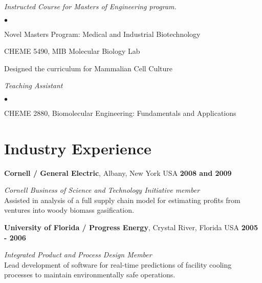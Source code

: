 \documentclass[margin,line]{res}
\newenvironment{list2}{
  \begin{list}{$\bullet$}{%
      \setlength{\itemsep}{0in}
      \setlength{\parsep}{0in} \setlength{\parskip}{0in}
      \setlength{\topsep}{0in} \setlength{\partopsep}{0in} 
      \setlength{\leftmargin}{0.2in}}}{\end{list}}
\begin{document}
\begin{resume}

{\em Instructed Course for Masters of Engineering program.}
\begin{list2}
\item Novel Masters Program: Medical and Industrial Biotechnology
\item CHEME 5490, MIB Molecular Biology Lab
\item Designed the curriculum for Mammalian Cell Culture  
\end{list2}

{\em Teaching Assistant}
\begin{list2}
\item CHEME 2880, Biomolecular Engineering: Fundamentals and Applications\\
\end{list2}


\section{\sc Industry Experience}
{\bf Cornell / General Electric}, Albany, New York USA \hfill {\bf 2008 and 2009}

\vspace{-.35cm}
{\em Cornell Business of Science and Technology Initiative member}\\ 
Assisted in analysis of a full supply chain model
for estimating profits from ventures into woody biomass gasification.      
\vspace{-.2cm}

{\bf University of Florida / Progress Energy}, Crystal River, Florida USA \hfill {\bf 2005 - 2006}

\vspace{-.35cm}
{\em Integrated Product and Process Design Member}\\ 
Lead development of software for real-time predictions
of facility cooling processes to maintain environmentally safe operations.
\vspace{-.2cm}


\end{resume}
\end{document}
